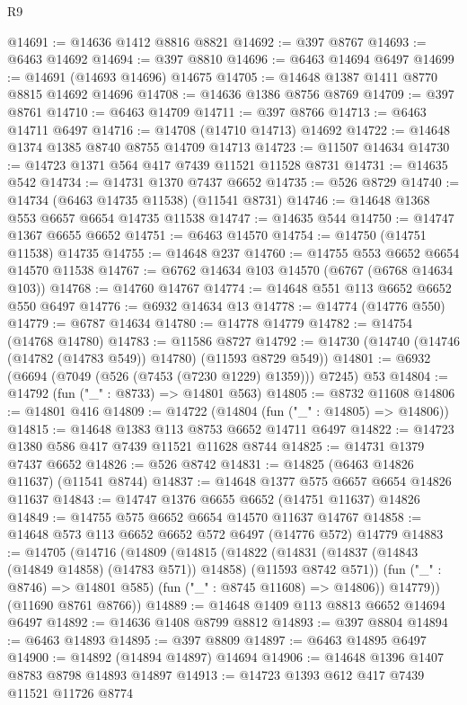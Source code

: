 \begin{lexlean}{R9}
\begin{coremodule}
@14691 := @14636 @1412 @8816 @8821
@14692 := @397 @8767
@14693 := @6463 @14692
@14694 := @397 @8810
@14696 := @6463 @14694 @6497
@14699 := @14691 (@14693 @14696) @14675
@14705 := @14648 @1387 @1411 @8770 @8815 @14692 @14696
@14708 := @14636 @1386 @8756 @8769
@14709 := @397 @8761
@14710 := @6463 @14709
@14711 := @397 @8766
@14713 := @6463 @14711 @6497
@14716 := @14708 (@14710 @14713) @14692
@14722 := @14648 @1374 @1385 @8740 @8755 @14709 @14713
@14723 := @11507 @14634
@14730 := @14723 @1371 @564 @417 @7439 @11521 @11528 @8731
@14731 := @14635 @542
@14734 := @14731 @1370 @7437 @6652
@14735 := @526 @8729
@14740 := @14734 (@6463 @14735 @11538) (@11541 @8731)
@14746 := @14648 @1368 @553 @6657 @6654 @14735 @11538
@14747 := @14635 @544
@14750 := @14747 @1367 @6655 @6652
@14751 := @6463 @14570
@14754 := @14750 (@14751 @11538) @14735
@14755 := @14648 @237
@14760 := @14755 @553 @6652 @6654 @14570 @11538
@14767 := @6762 @14634 @103 @14570 (@6767 (@6768 @14634 @103))
@14768 := @14760 @14767
@14774 := @14648 @551 @113 @6652 @6652 @550 @6497
@14776 := @6932 @14634 @13
@14778 := @14774 (@14776 @550)
@14779 := @6787 @14634
@14780 := @14778 @14779
@14782 := @14754 (@14768 @14780)
@14783 := @11586 @8727
@14792 := @14730 (@14740 (@14746 (@14782 (@14783 @549)) @14780) (@11593 @8729 @549))
@14801 := @6932 (@6694 (@7049 (@526 (@7453 (@7230 @1229) @1359))) @7245) @53
@14804 := @14792 (fun ("_" : @8733) => @14801 @563)
@14805 := @8732 @11608
@14806 := @14801 @416
@14809 := @14722 (@14804 (fun ("_" : @14805) => @14806))
@14815 := @14648 @1383 @113 @8753 @6652 @14711 @6497
@14822 := @14723 @1380 @586 @417 @7439 @11521 @11628 @8744
@14825 := @14731 @1379 @7437 @6652
@14826 := @526 @8742
@14831 := @14825 (@6463 @14826 @11637) (@11541 @8744)
@14837 := @14648 @1377 @575 @6657 @6654 @14826 @11637
@14843 := @14747 @1376 @6655 @6652 (@14751 @11637) @14826
@14849 := @14755 @575 @6652 @6654 @14570 @11637 @14767
@14858 := @14648 @573 @113 @6652 @6652 @572 @6497 (@14776 @572) @14779
@14883 := @14705
    (@14716
      (@14809
        (@14815
          (@14822
            (@14831 (@14837 (@14843 (@14849 @14858) (@14783 @571)) @14858) (@11593 @8742 @571))
            (fun ("_" : @8746) => @14801 @585)
            (fun ("_" : @8745 @11608) => @14806))
          @14779))
      (@11690 @8761 @8766))
@14889 := @14648 @1409 @113 @8813 @6652 @14694 @6497
@14892 := @14636 @1408 @8799 @8812
@14893 := @397 @8804
@14894 := @6463 @14893
@14895 := @397 @8809
@14897 := @6463 @14895 @6497
@14900 := @14892 (@14894 @14897) @14694
@14906 := @14648 @1396 @1407 @8783 @8798 @14893 @14897
@14913 := @14723 @1393 @612 @417 @7439 @11521 @11726 @8774

\end{coremodule}
\end{lexlean}
